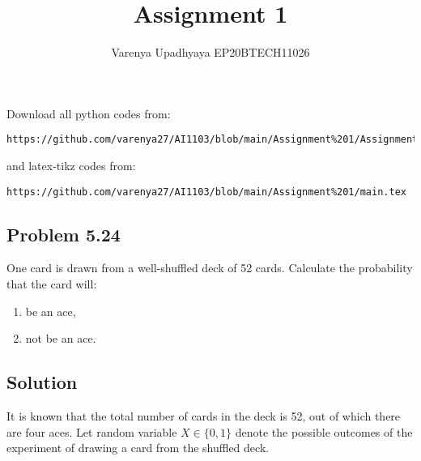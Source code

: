 \documentclass[journal,12pt,twocolumn]{IEEEtran}
\title{Assignment 1}
\author{Varenya Upadhyaya EP20BTECH11026}
\date{}
\begin{document}
\maketitle
Download all python codes from: 
\begin{lstlisting}
https://github.com/varenya27/AI1103/blob/main/Assignment%201/Assignment_1.py
\end{lstlisting}
and latex-tikz codes from:
\begin{lstlisting}
https://github.com/varenya27/AI1103/blob/main/Assignment%201/main.tex
\end{lstlisting}
\maketitle   
\begin{center}
\section*{Problem 5.24}
\end{center}
One card is drawn from a well-shuffled deck of 52 cards. Calculate the probability that the card will:
\begin{enumerate}[label=(\roman*)]
    \item be an ace,
    \item not be an ace.
\end{enumerate}
\begin{center}
\maketitle
    \section*{Solution}
\end{center}
It is known that the total number of cards in the deck is 52, out of which there are four aces. Let random variable $X \in \{0,1\}$ denote the possible outcomes of the experiment of drawing a card from the shuffled deck.\\
\begin{table}[h]
\\
\caption{Outcome of the Experiment} 
\label{table=1}
\end{table}
\end{document}
